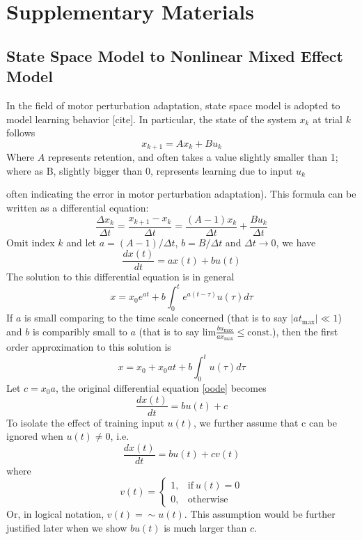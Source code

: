 \section{Supplementary Materials}
\subsection{State Space Model to Nonlinear Mixed Effect Model}
In the field of motor perturbation adaptation, state space model is adopted to model learning behavior [cite]. 
In particular, the state of the system $ x_k $ at trial $ k $ follows 
\begin{equation}\label{ssm}
x_{k+1} = Ax_k + Bu_k
\end{equation}
Where $ A $ represents retention, and often takes a value slightly smaller than 1; 
where as B, slightly bigger than 0, represents learning due to input $ u_k $ {often indicating the error in motor perturbation adaptation).
	This formula can be written as a differential equation:
	\begin{equation}
	\frac{\Delta x_k}{\Delta t} = \frac{x_{k+1}-x_k}{\Delta t} = \frac{(A-1)x_k}{\Delta t} + \frac{Bu_k}{\Delta t}
	\end{equation}
	Omit index $ k $ and let $ a = (A-1)/\Delta t $, $ b = B/\Delta t $ and $ \Delta t\rightarrow 0 $, we have
	\begin{equation}\label{oode}
	\frac{dx(t)}{dt} = ax(t)+bu(t)
	\end{equation}
	The solution to this differential equation is in general
	\begin{equation}\label{generalsolution}
	x = x_0e^{at} + b\int_0^t e^{a(t-\tau)}u(\tau)d\tau
	\end{equation}
	If $ a $ is small comparing to the time scale concerned (that is to say $ |at_{\text{max}}| \ll 1 $) and $ b $ is comparibly small to $ a $ (that is to say $ \text{lim}\frac{bu_\text{max}}{ax_\text{max}} \leqslant \text{const.} $), then the first order approximation to this solution is
	\begin{equation}\label{specialsolution}
	x = x_0 + x_0at + b \int_0^t u(\tau)d\tau
	\end{equation}
	Let $ c=x_0 a $, the original differential equation \ref{oode} becomes
	\begin{equation}
	\frac{dx(t)}{dt} = bu(t) + c
	\end{equation}
	To isolate the effect of training input $ u(t) $, we further assume that c can be ignored when $ u(t) \neq 0 $, i.e.
	\begin{equation}\label{fode}
	\frac{dx(t)}{dt} = bu(t) + cv(t)
	\end{equation}
	where
	\begin{equation}
	v(t) = 
	\begin{cases}
	1, & \text{if}\ u(t) = 0 \\
	0, & \text{otherwise}
	\end{cases}
	\end{equation}
	Or, in logical notation, $ v(t) = \sim u(t) $. 
	This assumption would be further justified later when we show $ bu(t) $ is much larger than $ c $.
	
}
